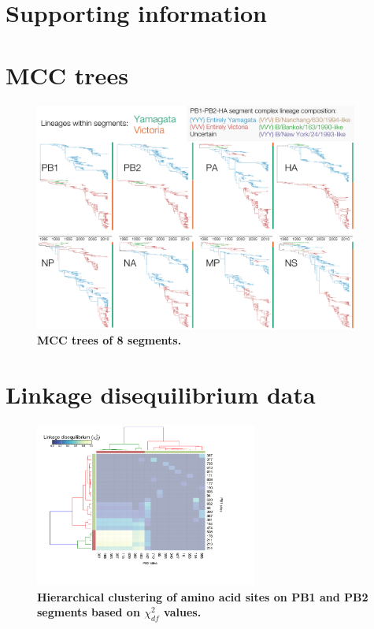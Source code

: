 \documentclass[11pt,oneside,letterpaper]{article}
\begin{document}
\section*{Supporting information}
\setcounter{figure}{0}
\setcounter{table}{0}
\renewcommand{\thefigure}{S\arabic{figure}}
\renewcommand{\thetable}{S\arabic{table}}


\section*{MCC trees}

\begin{figure}
\centering  
\includegraphics[width=0.95\textwidth]  {supp_figures/InfB_genomeGrid.pdf}
\caption{\textbf{MCC trees of 8 segments.}}
\label{}
\end{figure}

\section*{Linkage disequilibrium data}

\begin{figure}
\centering  
\includegraphics[width=0.65\textwidth]  {supp_figures/Chi_PB1_PB2.png}
\caption{\textbf{Hierarchical clustering of amino acid sites on PB1 and PB2 segments based on $\chi^{2}_{df}$ values.}}
\label{ChiPB1PB2}
\end{figure}
\end{document}
